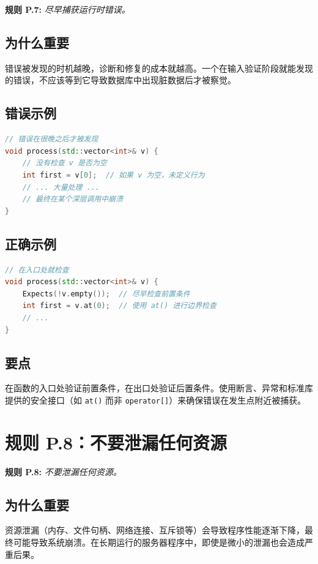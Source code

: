 \textbf{规则 P.7:} \textit{尽早捕获运行时错误。}

\subsection{为什么重要}

错误被发现的时机越晚，诊断和修复的成本就越高。一个在输入验证阶段就能发现的错误，不应该等到它导致数据库中出现脏数据后才被察觉。

\subsection{错误示例}

\begin{lstlisting}[language=C++]
// 错误在很晚之后才被发现
void process(std::vector<int>& v) {
    // 没有检查 v 是否为空
    int first = v[0];  // 如果 v 为空，未定义行为
    // ... 大量处理 ...
    // 最终在某个深层调用中崩溃
}
\end{lstlisting}

\subsection{正确示例}

\begin{lstlisting}[language=C++]
// 在入口处就检查
void process(std::vector<int>& v) {
    Expects(!v.empty());  // 尽早检查前置条件
    int first = v.at(0);  // 使用 at() 进行边界检查
    // ...
}
\end{lstlisting}

\subsection{要点}
在函数的入口处验证前置条件，在出口处验证后置条件。使用断言、异常和标准库提供的安全接口（如 \texttt{at()} 而非 \texttt{operator[]}）来确保错误在发生点附近被捕获。

\section{规则 P.8：不要泄漏任何资源}

\textbf{规则 P.8:} \textit{不要泄漏任何资源。}

\subsection{为什么重要}

资源泄漏（内存、文件句柄、网络连接、互斥锁等）会导致程序性能逐渐下降，最终可能导致系统崩溃。在长期运行的服务器程序中，即使是微小的泄漏也会造成严重后果。

